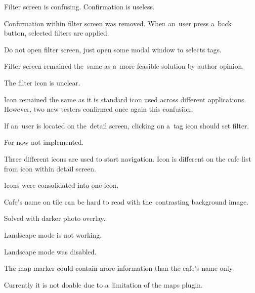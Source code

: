 \begin{questions}
  \item Filter screen is confusing. Confirmation is useless.
         \begin{answer}
          Confirmation within filter screen was removed. When an~user press a~back button, selected filters are applied.
         \end{answer}
    \item Do not open filter screen, just open some modal window to selects tags.
         \begin{answer}
          Filter screen remained the~same as a~more feasible solution by author opinion.
         \end{answer}
    \item The filter icon is unclear.
         \begin{answer}
          Icon remained the same as it is standard icon used across different applications. However, two new testers confirmed once again this confusion. 
         \end{answer}
    \item If an~user is located on the~detail screen, clicking on a~tag icon should set filter.
         \begin{answer}
         For now not implemented. 
         \end{answer}
   \item Three different icons are used to start navigation. Icon is different on the cafe list from icon within detail screen.
         \begin{answer}
          Icons were consolidated into one icon.
         \end{answer}
   \item Cafe's name on tile can be hard to read with the~contrasting background image.
         \begin{answer}
          Solved with darker photo overlay.
         \end{answer}
   \item Landscape mode is not working.
         \begin{answer}
          Landscape mode was disabled. 
         \end{answer}
   \item The map marker could contain more information than the cafe's name only.
         \begin{answer}
          Currently it is not doable due to a~limitation of the maps plugin.
         \end{answer}
\end{questions}

